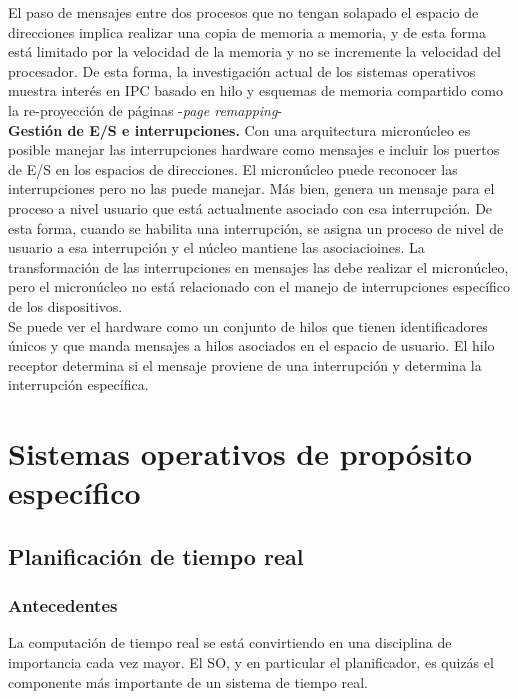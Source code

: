\documentclass{article}
\begin{document}
				El paso de mensajes entre dos procesos que no tengan solapado el espacio de direcciones implica realizar una copia de memoria a memoria, y de esta forma está limitado por la velocidad de la memoria y no se incremente la velocidad del procesador. De esta forma, la investigación actual de los sistemas operativos muestra interés en IPC basado en hilo y esquemas de memoria compartido como la re-proyección de páginas -\textit{page remapping}- \\
				
				\textbf{Gestión de E/S e interrupciones.} Con una arquitectura micronúcleo es posible manejar las interrupciones hardware como mensajes e incluir los puertos de E/S en los espacios de direcciones. El micronúcleo puede reconocer las interrupciones pero no las puede manejar. Más bien, genera un mensaje para el proceso a nivel usuario que está actualmente asociado con esa interrupción. De esta forma, cuando se habilita una interrupción, se asigna un proceso de nivel de usuario a esa interrupción y el núcleo mantiene las asociacioines. La transformación de las interrupciones en mensajes las debe realizar el micronúcleo, pero el micronúcleo no está relacionado con el manejo de interrupciones específico de los dispositivos. \\
				
				Se puede ver el hardware como un conjunto de hilos que tienen identificadores únicos y que manda mensajes a hilos asociados en el espacio de usuario. El hilo receptor determina si el mensaje proviene de una interrupción y determina la interrupción específica.
			
	\section{Sistemas operativos de propósito específico}
		\subsection{Planificación de tiempo real}
			\subsubsection{Antecedentes}
				La computación de tiempo real se está convirtiendo en una disciplina de importancia cada vez mayor. El SO, y en particular el planificador, es quizás el componente más importante de un sistema de tiempo real. \\
				
\end{document}
